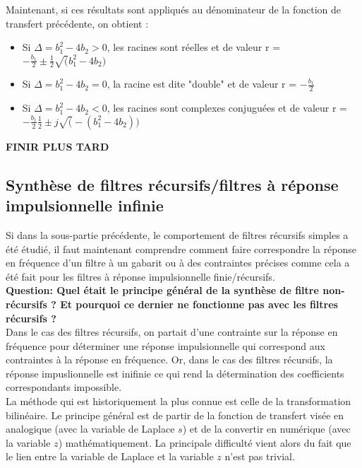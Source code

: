 \documentclass[11pt,a4paper]{article}
\begin{document}
Maintenant, si  ces résultats sont appliqués au dénominateur de la fonction de transfert précédente, on obtient :

\begin{itemize}
\item Si $\Delta = b_1^2 -4b_2 >0$, les racines sont réelles et de valeur r = $-\frac{b_1}{2} \pm \frac{1}{2}\sqrt(b_1^2 -4b_2)$
\item Si $\Delta = b_1^2 -4b_2 = 0$, la racine est dite "double" et de valeur r = $-\frac{b_1}{2}$
\item Si $\Delta = b_1^2 -4b_2 < 0$, les racines sont complexes conjuguées et de valeur r = $-\frac{b_1}{2} \frac{1}{2} \pm j\sqrt(-(b_1^2 -4b_2))$
\end{itemize}

\textbf{FINIR PLUS TARD \label{to be finished IIR}}

\subsection{Synthèse de filtres récursifs/filtres à réponse impulsionnelle infinie}
Si dans la sous-partie précédente, le comportement de filtres récursifs simples a été étudié, il faut maintenant comprendre comment faire correspondre la réponse en fréquence d'un filtre à un gabarit ou à des contraintes précises comme cela a été fait pour les filtres à réponse impulsionnelle finie/récursifs.\\

\textbf{Question: Quel était le principe général de la synthèse de filtre non-récursifs ? Et pourquoi ce dernier ne fonctionne pas avec les filtres récursifs ?}\\

Dans le cas des filtres récursifs, on partait d'une contrainte sur la réponse en fréquence pour déterminer une réponse impulsionnelle qui correspond aux contraintes à la réponse en fréquence. Or, dans le cas des filtres récursifs, la réponse impuslionnelle est inifinie ce qui rend la détermination des coefficients correspondants impossible.\\

La méthode qui est historiquement la plus connue est celle de la transformation bilinéaire. Le principe général est de partir de la fonction  de transfert visée en analogique (avec la variable de Laplace $s$) et de la convertir en numérique (avec la variable $z$) mathématiquement. La principale difficulté  vient alors du fait que le lien entre la variable de Laplace et la variable $z$ n'est pas trivial.\\ 
\end{document}
